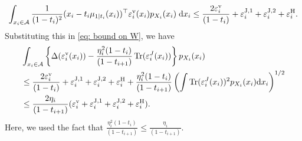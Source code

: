 \documentclass{article}
\theoremstyle{plain}
\theoremstyle{definition}
\theoremstyle{remark}
\def\cA{\mathcal{A}}
\def\evel{\varepsilon^{\rm v}}
\def\evelJone{\varepsilon^{\rm J,1}}
\def\evelJtwo{\varepsilon^{\rm J,2}}
\def\evelH{\varepsilon^{\rm H}}
\def\dx{{\mathrm{d}x}}
\newcommand{\br}[1]{\left({#1}\right)}
\DeclareMathOperator{\Tr}{Tr}
\begin{document}
\[
\int_{x_i \in \cA} \frac{1}{(1-t_i)^2}(x_i - t_i \mu_{1 \mid t_i}(x_i))^\top \varepsilon^{\rm v}_i(x_i)p_{X_i}(x_i) \; \dx_i \le \frac{2 \evel_i}{(1-t_i)} + 
\evelJone_i + \evelJtwo_i + \evelH_i.
\]
Substituting this in \eqref{eq: bound on W}, we have 
\begin{align*}
& \int_{x_i \in \cA}
\left\{\Delta(\evel_i(x_i))- \frac{\eta_i^2 (1-t_i)}{(1-t_{i+1})} \Tr(\varepsilon_i^J(x_i))\right\} p_{X_i}(x_i) \\
& \le  \frac{2 \evel_i}{(1-t_i)} + 
\evelJone_i + \evelJtwo_i + \evelH_i +  \frac{\eta_i^2 (1-t_i)}{(1-t_{i+1})} \br{\int \Tr(\varepsilon_i^J(x_i))^2 p_{X_i}(x_i)\dx_i}^{1/2}\\
& \le \frac{2 \eta_i }{(1-t_{i+1})}( \evel_i + \evelJone_i + \evelJtwo_i + \evelH_i) .
\end{align*}
Here, we used the fact that $\frac{\eta_i^2 (1-t_i)}{(1 - t_{i+1})} \le \frac{\eta_i}{(1-t_{i+1})}$. 
\end{document}
